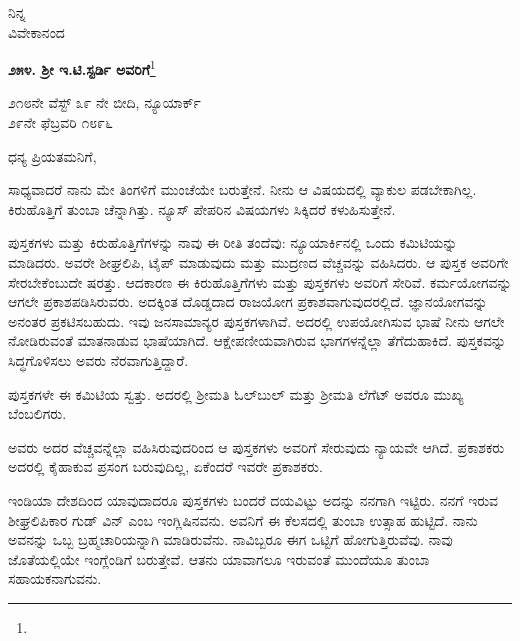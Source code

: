 \vspace{-0.5cm}

{\flushright
ನಿನ್ನ\\ವಿವೇಕಾನಂದ\par}

\begin{center}
\textbf{೨೫೪. ಶ‍್ರೀ ಇ.ಟಿ.ಸ್ಟರ್ಡಿ ಅವರಿಗೆ}\footnote{}
\end{center}

\vspace{-0.5cm}

\begin{flushright}
೨೧೮ನೇ ವೆಸ್ಟ್ ೩೯ ನೇ ಬೀದಿ, ನ್ಯೂಯಾರ್ಕ್\\೨೯ನೇ ಫೆಬ್ರವರಿ ೧೮೯೬
\end{flushright}

\vspace{-0.3cm}

\noindent
ಧನ್ಯ ಪ್ರಿಯತಮನಿಗೆ,

ಸಾಧ್ಯವಾದರೆ ನಾನು ಮೇ ತಿಂಗಳಿಗೆ ಮುಂಚೆಯೇ ಬರುತ್ತೇನೆ. ನೀನು ಆ ವಿಷಯದಲ್ಲಿ ವ್ಯಾಕುಲ ಪಡಬೇಕಾಗಿಲ್ಲ. ಕಿರುಹೊತ್ತಿಗೆ ತುಂಬಾ ಚೆನ್ನಾಗಿತ್ತು. ನ್ಯೂಸ್ ಪೇಪರಿನ ವಿಷಯಗಳು ಸಿಕ್ಕಿದರೆ ಕಳುಹಿಸುತ್ತೇನೆ.

ಪುಸ್ತಕಗಳು ಮತ್ತು ಕಿರುಹೊತ್ತಿಗೆಗಳನ್ನು ನಾವು ಈ ರೀತಿ ತಂದೆವು: ನ್ಯೂಯಾರ್ಕಿನಲ್ಲಿ ಒಂದು ಕಮಿಟಿಯನ್ನು ಮಾಡಿದರು. ಅವರೇ ಶೀಘ್ರಲಿಪಿ, ಟೈಪ್ ಮಾಡುವುದು ಮತ್ತು ಮುದ್ರಣದ ವೆಚ್ಚವನ್ನು ವಹಿಸಿದರು. ಆ ಪುಸ್ತಕ ಅವರಿಗೇ ಸೇರಬೇಕೆಂಬುದೇ ಷರತ್ತು. ಆದಕಾರಣ ಈ ಕಿರುಹೊತ್ತಿಗೆಗಳು  ಮತ್ತು ಪುಸ್ತಕಗಳು ಅವರಿಗೆ ಸೇರಿವೆ. ಕರ್ಮಯೋಗವನ್ನು ಆಗಲೇ ಪ್ರಕಾಶಪಡಿಸಿರುವರು. ಅದಕ್ಕಿಂತ ದೊಡ್ಡದಾದ ರಾಜಯೋಗ ಪ್ರಕಾಶವಾಗುವುದರಲ್ಲಿದೆ. ಜ್ಞಾನಯೋಗವನ್ನು ಅನಂತರ ಪ್ರಕಟಿಸಬಹುದು. ಇವು ಜನಸಾಮಾನ್ಯರ ಪುಸ್ತಕಗಳಾಗಿವೆ. ಅದರಲ್ಲಿ ಉಪಯೋಗಿಸುವ ಭಾಷೆ ನೀನು ಆಗಲೇ ನೋಡಿರುವಂತೆ ಮಾತನಾಡುವ ಭಾಷೆಯಾಗಿದೆ. ಆಕ್ಷೇಪಣೀಯವಾಗಿರುವ ಭಾಗಗಳನ್ನೆಲ್ಲಾ ತೆಗೆದುಹಾಕಿದೆ. ಪುಸ್ತಕವನ್ನು ಸಿದ್ಧಗೊಳಿಸಲು ಅವರು ನೆರವಾಗುತ್ತಿದ್ದಾರೆ.

ಪುಸ್ತಕಗಳೇ ಈ ಕಮಿಟಿಯ ಸ್ವತ್ತು. ಅದರಲ್ಲಿ ಶ‍್ರೀಮತಿ ಓಲ್‌ಬುಲ್ ಮತ್ತು ಶ‍್ರೀಮತಿ ಲೆಗೆಟ್ ಅವರೂ ಮುಖ್ಯ ಬೆಂಬಲಿಗರು.

ಅವರು ಅದರ ವೆಚ್ಚವನ್ನೆಲ್ಲಾ ವಹಿಸಿರುವುದರಿಂದ ಆ ಪುಸ್ತಕಗಳು ಅವರಿಗೆ ಸೇರುವುದು ನ್ಯಾಯವೇ ಆಗಿದೆ. ಪ್ರಕಾಶಕರು ಅದರಲ್ಲಿ ಕೈಹಾಕುವ ಪ್ರಸಂಗ ಬರುವುದಿಲ್ಲ, ಏಕೆಂದರೆ ಇವರೇ ಪ್ರಕಾಶಕರು.

ಇಂಡಿಯಾ ದೇಶದಿಂದ ಯಾವುದಾದರೂ ಪುಸ್ತಕಗಳು ಬಂದರೆ ದಯವಿಟ್ಟು ಅದನ್ನು ನನಗಾಗಿ ಇಟ್ಟಿರು. ನನಗೆ ಇರುವ ಶೀಘ್ರಲಿಪಿಕಾರ ಗುಡ್ ವಿನ್ ಎಂಬ ಇಂಗ್ಲಿಷಿನವನು. ಅವನಿಗೆ ಈ ಕೆಲಸದಲ್ಲಿ ತುಂಬಾ ಉತ್ಸಾಹ ಹುಟ್ಟಿದೆ. ನಾನು ಅವನನ್ನು ಒಬ್ಬ ಬ್ರಹ್ಮಚಾರಿಯನ್ನಾಗಿ ಮಾಡಿರುವೆನು. ನಾವಿಬ್ಬರೂ ಈಗ ಒಟ್ಟಿಗೆ ಹೋಗುತ್ತಿರುವೆವು. ನಾವು ಜೊತೆಯಲ್ಲಿಯೇ ಇಂಗ್ಲೆಂಡಿಗೆ ಬರುತ್ತೇವೆ. ಆತನು ಯಾವಾಗಲೂ ಇರುವಂತೆ ಮುಂದೆಯೂ ತುಂಬಾ ಸಹಾಯಕನಾಗುವನು.

\vspace{-0.5cm}


